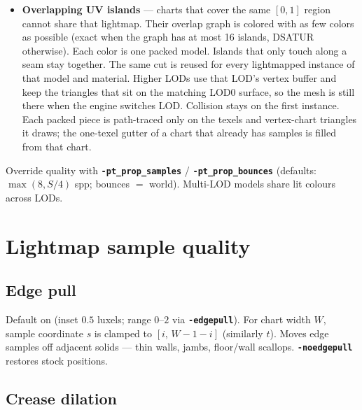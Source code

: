 \documentclass[11pt,a4paper]{article}
\newcommand{\flag}[1]{\texttt{\bfseries #1}}
\begin{document}
\begin{itemize}[leftmargin=1.4em]
        materials have no draw strips, and each gets its own
        \texttt{texelslighting\_N.ppl}. Meshes of that material are rasterized
        into the one image. The first instance keeps collision; the others
        are non-solid.
  \item \textbf{Overlapping UV islands} --- charts that cover the same
        $[0,1]$ region cannot share that lightmap. Their overlap graph is
        colored with as few colors as possible (exact when the graph has at
        most 16 islands, DSATUR otherwise). Each color is one packed model.
        Islands that only touch along a seam stay together. The same cut is
        reused for every lightmapped instance of that model and material.
        Higher LODs use that LOD's vertex buffer and keep the triangles that
        sit on the matching LOD0 surface, so the mesh is still there when the
        engine switches LOD. Collision stays
        on the first instance. Each packed piece is path-traced only on the
        texels and vertex-chart triangles it draws; the one-texel gutter of a
        chart that already has samples is filled from that chart.
\end{itemize}
Override quality with \flag{-pt\_prop\_samples} /
\flag{-pt\_prop\_bounces} (defaults: $\max(8,S/4)$ spp; bounces $=$ world).
Multi-LOD models share lit colours across LODs.

\section{Lightmap sample quality}
\label{sec:luxelq}

\subsection{Edge pull}

Default on (inset $0.5$ luxels; range $0$--$2$ via \flag{-edgepull}).
For chart width $W$, sample coordinate $s$ is clamped to $[i,\,W-1-i]$
(similarly $t$). Moves edge samples off adjacent solids --- thin walls, jambs,
floor/wall scallops. \flag{-noedgepull} restores stock positions.

\subsection{Crease dilation}
\end{document}
